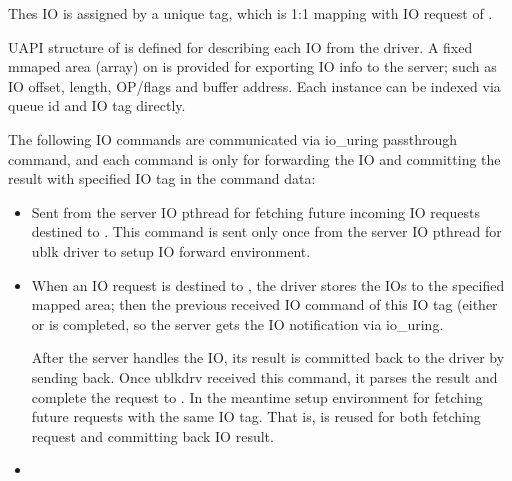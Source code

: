 \documentclass[a4paper,11pt,english]{sphinxmanual}
\begin{document}
The\textquotesingle{}s IO is assigned by a unique tag, which is 1:1 mapping with IO
request of .

UAPI structure of  is defined for describing each IO from
the driver. A fixed mmaped area (array) on  is provided for
exporting IO info to the server; such as IO offset, length, OP/flags and
buffer address. Each  instance can be indexed via queue id
and IO tag directly.

The following IO commands are communicated via io\_uring passthrough command,
and each command is only for forwarding the IO and committing the result
with specified IO tag in the command data:
\begin{itemize}
\item {} 

Sent from the server IO pthread for fetching future incoming IO requests
destined to . This command is sent only once from the server
IO pthread for ublk driver to setup IO forward environment.

\item {} 

When an IO request is destined to , the driver stores
the IO\textquotesingle{}s  to the specified mapped area; then the
previous received IO command of this IO tag (either 
or  is completed, so the server gets
the IO notification via io\_uring.

After the server handles the IO, its result is committed back to the
driver by sending  back. Once ublkdrv
received this command, it parses the result and complete the request to
. In the meantime setup environment for fetching future
requests with the same IO tag. That is, 
is reused for both fetching request and committing back IO result.

\item {} 


\end{itemize}
\end{document}

